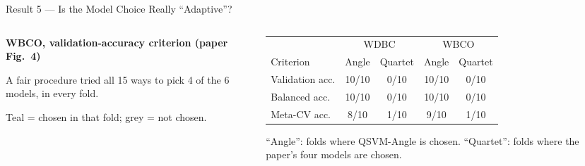 \documentclass[aspectratio=169,11pt,t,xcolor={table}]{beamer}
\begin{document}
\begin{frame}{Result 5 --- Is the Model Choice Really ``Adaptive''?}
  \begin{columns}[T,onlytextwidth]
    \begin{column}{0.53\textwidth}
      \centering
      {\footnotesize\bfseries WBCO, validation-accuracy criterion (paper Fig.~4)}\par
      {\tiny A fair procedure tried all 15 ways to pick 4 of the 6 models, in every fold.\par}\vspace{1mm}
      \par
      \vspace{1mm}
      {\tiny Teal = chosen in that fold; grey = not chosen.\par}
    \end{column}
    \begin{column}{0.45\textwidth}
      \scriptsize\setlength{\tabcolsep}{4pt}
      \renewcommand{\arraystretch}{1.15}
      \begin{tabular}{@{}lcccc@{}}
        \toprule
        & \multicolumn{2}{c}{WDBC} & \multicolumn{2}{c}{WBCO}\\
        \cmidrule(lr){2-3}\cmidrule(lr){4-5}
        Criterion & Angle & Quartet & Angle & Quartet \\
        \midrule
        Validation acc. & 10/10 & 0/10 & 10/10 & 0/10 \\
        Balanced acc.   & 10/10 & 0/10 & 10/10 & 0/10 \\
        Meta-CV acc.    & 8/10  & 1/10 & 9/10  & 1/10 \\
        \bottomrule
      \end{tabular}\par
      \vspace{1mm}
      {\tiny ``Angle'': folds where QSVM-Angle is chosen. ``Quartet'': folds where the paper's four models are chosen.\par}

\end{column}
\end{columns}
\end{frame}
\end{document}
